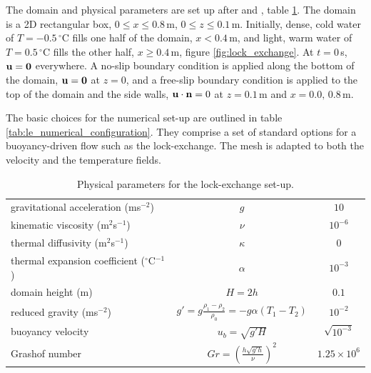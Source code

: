 The domain and physical parameters are set up after \cite{fringer_06} and \cite{ozgokmen_07}, table \ref{tab:le_physical_parameters}. The domain is a 2D rectangular box, $0\leq x \leq 0.8\,$m, $0 \leq z \leq 0.1\,$m. Initially, dense, cold water of $T = -0.5\,^\circ$C fills one half of the domain, $x<0.4\,$m, and light, warm water of $T = 0.5\,^\circ$C fills the other half, $x\geq0.4\,$m, figure \ref{fig:lock_exchange}. At $t=0\,$s, ${\bf u} = {\bf 0}$ everywhere. A no-slip boundary condition is applied along the bottom of the domain, ${\bf u = 0}$ at $z=0$, and a free-slip boundary condition is applied to the top of the domain and the side walls, ${\bf u\cdot\bf n} = 0$ at $z = 0.1\,$m and $x = 0.0,\, 0.8\,$m.

The basic choices for the numerical set-up are outlined in table \ref{tab:le_numerical_configuration}. They comprise a set of standard options for a buoyancy-driven flow such as the lock-exchange. The mesh is adapted to both the velocity and the temperature fields.  

\begin{table}[th]
\centering
\begin{tabular}[h]{l   c  c }  \hline
gravitational acceleration (ms$^{-2}$)			& $g$ 								& $10$  \\
kinematic viscosity (m$^2$s$^{-1}$)			& $\nu$								& $10^{-6}$  \\
thermal diffusivity (m$^2$s$^{-1}$)					& $\kappa$ 					& 0  \\
thermal expansion coefficient ($^\circ$C$^{-1}$)	& $\alpha$ 							& $10^{-3}$ \\ 
domain height (m)					& $H = 2h$							& $0.1$ \\ %
reduced gravity	(ms$^{-2}$)				& $g' = g\frac{\rho_1 - \rho_2}{\rho_0} = -g\alpha (T_1 - T_2)$	& $10^{-2}$  \\
buoyancy velocity					& $u_b = \sqrt{g'H}$ 						& $\sqrt{10^{-3}}$ \\
Grashof number						& $Gr = \left( \frac{h \sqrt{g'h}}{\nu} \right)^2$ 		& $1.25 \times 10^{6}$\\ \hline
\end{tabular}
\caption{Physical parameters for the lock-exchange set-up.}
\label{tab:le_physical_parameters}
\end{table}

